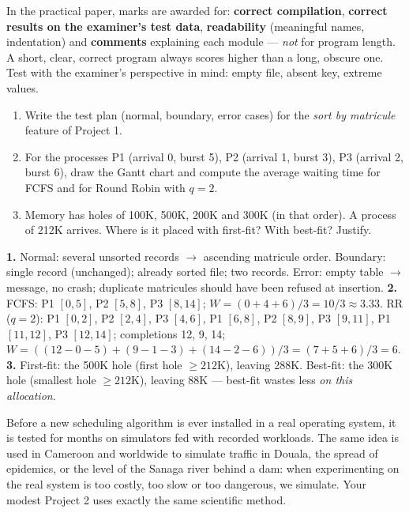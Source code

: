 \documentclass[11pt]{article}
\begin{document}
\begin{aretenir}
In the practical paper, marks are awarded for: \textbf{correct compilation}, \textbf{correct results on the examiner's test data}, \textbf{readability} (meaningful names, indentation) and \textbf{comments} explaining each module --- \emph{not} for program length. A short, clear, correct program always scores higher than a long, obscure one. Test with the examiner's perspective in mind: empty file, absent key, extreme values.
\end{aretenir}

\begin{exercice}[Consolidation]
\begin{enumerate}
\item Write the test plan (normal, boundary, error cases) for the \emph{sort by matricule} feature of Project 1.
\item For the processes P1 (arrival 0, burst 5), P2 (arrival 1, burst 3), P3 (arrival 2, burst 6), draw the Gantt chart and compute the average waiting time for FCFS and for Round Robin with $q = 2$.
\item Memory has holes of 100K, 500K, 200K and 300K (in that order). A process of 212K arrives. Where is it placed with first-fit? With best-fit? Justify.
\end{enumerate}
\end{exercice}

\begin{corrige}[Consolidation]
\textbf{1.} Normal: several unsorted records $\to$ ascending matricule order. Boundary: single record (unchanged); already sorted file; two records. Error: empty table $\to$ message, no crash; duplicate matricules should have been refused at insertion.
\textbf{2.} FCFS: P1 $[0,5]$, P2 $[5,8]$, P3 $[8,14]$; $W = (0 + 4 + 6)/3 = 10/3 \approx 3.33$. RR ($q=2$): P1 $[0,2]$, P2 $[2,4]$, P3 $[4,6]$, P1 $[6,8]$, P2 $[8,9]$, P3 $[9,11]$, P1 $[11,12]$, P3 $[12,14]$; completions 12, 9, 14; $W = ((12-0-5) + (9-1-3) + (14-2-6))/3 = (7+5+6)/3 = 6$.
\textbf{3.} First-fit: the 500K hole (first hole $\geq 212$K), leaving 288K. Best-fit: the 300K hole (smallest hole $\geq 212$K), leaving 88K --- best-fit wastes less \emph{on this allocation}.
\end{corrige}

\begin{savaistu}
Before a new scheduling algorithm is ever installed in a real operating system, it is tested for months on simulators fed with recorded workloads. The same idea is used in Cameroon and worldwide to simulate traffic in Douala, the spread of epidemics, or the level of the Sanaga river behind a dam: when experimenting on the real system is too costly, too slow or too dangerous, we simulate. Your modest Project 2 uses exactly the same scientific method.
\end{savaistu}
\end{document}
